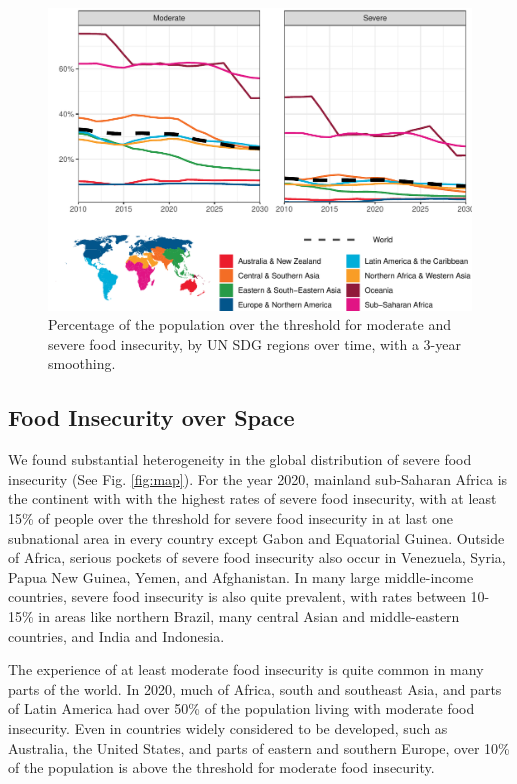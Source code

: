 \documentclass{article}
\begin{document}
\begin{figure}[H]
  \centering
  \includegraphics[width=\linewidth]{img/Rates.pdf}
  \caption{Percentage of the population over the threshold for moderate and severe food insecurity, by UN SDG regions over time, with a 3-year smoothing.}
  \label{fig:timeseries}
\end{figure}


\subsection{Food Insecurity over Space}
We found substantial heterogeneity in the global distribution of severe food insecurity (See Fig. \ref{fig:map}).  For the year 2020, mainland sub-Saharan Africa is the continent with with the highest rates of severe food insecurity, with at least 15\% of people over the threshold for severe food insecurity in at last one subnational area in every country except Gabon and Equatorial Guinea.  Outside of Africa, serious pockets of severe food insecurity also occur in Venezuela, Syria, Papua New Guinea, Yemen, and Afghanistan.  In many large middle-income countries, severe food insecurity is also quite prevalent, with rates between 10-15\% in areas like northern Brazil, many central Asian and middle-eastern countries, and India and Indonesia.

The experience of at least moderate food insecurity is quite common in many parts of the world.  In 2020, much of Africa, south and southeast Asia, and parts of Latin America had over 50\% of the population living with moderate food insecurity.  Even in countries widely considered to be developed, such as Australia, the United States, and parts of eastern and southern Europe, over 10\% of the population is above the threshold for moderate food insecurity.  
\end{document}
